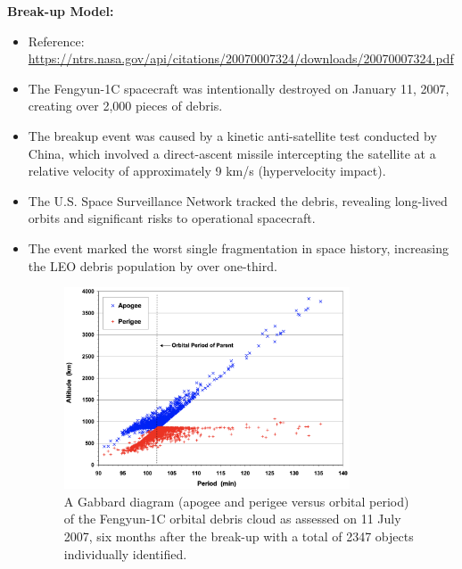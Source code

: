 \documentclass[12pt]{report}
\begin{document}
\noindent \textbf{Break-up Model:}
\begin{itemize}
  \item Reference: \url{https://ntrs.nasa.gov/api/citations/20070007324/downloads/20070007324.pdf}
  \item The Fengyun-1C spacecraft was intentionally destroyed on January 11, 2007, creating over 2,000 pieces of debris.
  \item The breakup event was caused by a kinetic anti-satellite test conducted by China, which involved a direct-ascent missile intercepting the satellite at a relative velocity of approximately 9 km/s (hypervelocity impact).
  \item The U.S. Space Surveillance Network tracked the debris, revealing long-lived orbits and significant risks to operational spacecraft.
  \item The event marked the worst single fragmentation in space history, increasing the LEO debris population by over one-third.
  
  \begin{figure}[H]
    \centering
    \includegraphics[width=0.8\textwidth]{figure_week_6_gabbard-diagram.png}
    \caption{A Gabbard diagram (apogee and perigee versus orbital period) of the Fengyun-1C orbital debris cloud as assessed on 11 July 2007, six months after the break-up with a total of 2347 objects individually identified.}
    \label{fig:Gabbard diagram}
  \end{figure}
  

\end{itemize}
\end{document}
